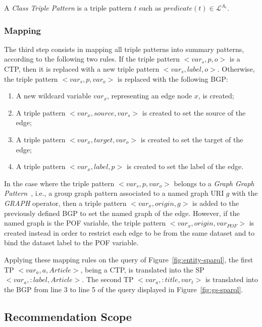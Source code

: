 \begin{definition}
A \emph{Class Triple Pattern} is a triple pattern $t$ such as $predicate(t) \in \mathcal{L}^{A_c}$.
\label{def:class-triple-pattern}
\end{definition}

\subsubsection{Mapping}

The third step consists in mapping all triple patterns into summary patterns, according to the following two rules. If the triple pattern $<var_s, p, o>$ is a CTP, then it is replaced with a new triple pattern \mbox{$<var_s, label, o>$}. Otherwise, the triple pattern \mbox{$<var_s, p, var_o>$} is replaced with the following BGP:

\begin{enumerate}
    \item A new wildcard variable $var_x$, representing an edge node $x$, is created;
    \item A triple pattern $<var_x, source, var_s>$ is created to set the source of the edge;
    \item A triple pattern $<var_x, target, var_o>$ is created to set the target of the edge;
    \item A triple pattern $<var_x, label, p>$ is created to set the label of the edge.
\end{enumerate}

In the case where the triple pattern $<var_s, p, var_o>$ belongs to a \emph{Graph Graph Pattern}~\cite{PrudS08}, i.e., a group graph pattern associated to a named graph URI $g$ with the \emph{GRAPH} operator, then a triple pattern $<var_x, origin, g>$ is added to the previously defined BGP to set the named graph of the edge. However, if the named graph is the POF variable, the triple pattern $<var_x, origin, var_{POF}>$ is created instead in order to restrict each edge to be from the same dataset and to bind the dataset label to the POF variable.

Applying these mapping rules on the query of Figure~\ref{fig:entity-sparql}, the first TP \mbox{$<var_a, a, Article>$}, being a CTP, is translated into the SP \mbox{$<var_a, :label, Article>$}. The second TP \mbox{$<var_a, :title, var_t>$} is translated into the BGP from line 3 to line 5 of the query displayed in Figure~\ref{fig:gs-sparql}.

\subsection{Recommendation Scope}

